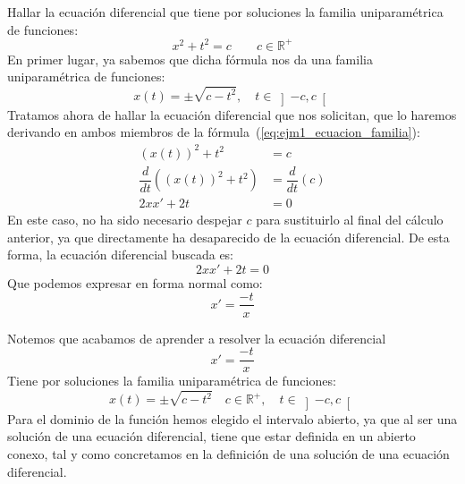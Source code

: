 \begin{ejemplo}
    Hallar la ecuación diferencial que tiene por soluciones la familia uniparamétrica de funciones:
    \begin{equation}\label{eq:ejm1_ecuacion_familia}
        x^2+t^2 = c\qquad c\in \mathbb{R}^+
    \end{equation}
    En primer lugar, ya sabemos que dicha fórmula nos da una familia uniparamétrica de funciones:
    \begin{equation*}
        x(t) = \pm \sqrt{c-t^2}, \quad t\in \left]-c,c\right[
    \end{equation*}
    Tratamos ahora de hallar la ecuación diferencial que nos solicitan, que lo haremos derivando en ambos miembros de la fórmula~(\ref{eq:ejm1_ecuacion_familia}):
    \begin{align*}
        {(x(t))}^{2}+t^2 &= c \\
        \dfrac{d}{dt}\left({(x(t))}^{2}+t^2 \right) &= \dfrac{d}{dt}(c) \\
        2xx' + 2t &= 0
    \end{align*}
    En este caso, no ha sido necesario despejar $c$ para sustituirlo al final del cálculo anterior, ya que directamente ha desaparecido de la ecuación diferencial. De esta forma, la ecuación diferencial buscada es:
    \begin{equation*}
        2xx' + 2t = 0
    \end{equation*}
    Que podemos expresar en forma normal como:
    \begin{equation*}
        x' = \dfrac{-t}{x}
    \end{equation*}
\end{ejemplo}

\begin{observacion}\label{obs:3a_ec_dif}
    Notemos que acabamos de aprender a resolver la ecuación diferencial
    \begin{equation*}
        x' = \dfrac{-t}{x}
    \end{equation*}
    Tiene por soluciones la familia uniparamétrica de funciones:
    \begin{equation*}
        x(t) = \pm \sqrt{c-t^2} \quad c\in \mathbb{R}^+, \quad t\in \left]-c,c\right[
    \end{equation*}
    Para el dominio de la función hemos elegido el intervalo abierto, ya que al ser una solución de una ecuación diferencial, tiene que estar definida en un abierto conexo, tal y como concretamos en la definición de una solución de una ecuación diferencial.
\end{observacion}


